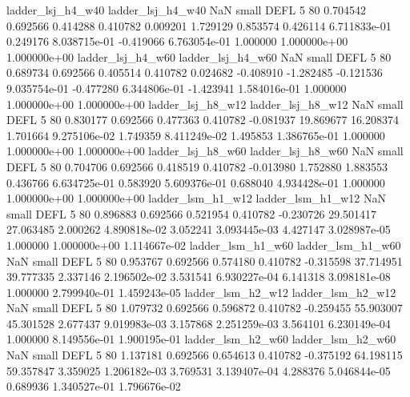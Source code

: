        ladder_lsj_h4_w40        ladder_lsj_h4_w40                   NaN      small     DEFL                 5 80 0.704542       0.692566 0.414288       0.410782    0.009201      1.729129      0.853574     0.426114   6.711833e-01  0.249176 8.038715e-01    -0.419066   6.763054e-01            1.000000    1.000000e+00        1.000000e+00
       ladder_lsj_h4_w60        ladder_lsj_h4_w60                   NaN      small     DEFL                 5 80 0.689734       0.692566 0.405514       0.410782    0.024682     -0.408910     -1.282485    -0.121536   9.035754e-01 -0.477280 6.344806e-01    -1.423941   1.584016e-01            1.000000    1.000000e+00        1.000000e+00
       ladder_lsj_h8_w12        ladder_lsj_h8_w12                   NaN      small     DEFL                 5 80 0.830177       0.692566 0.477363       0.410782   -0.081937     19.869677     16.208374     1.701664   9.275106e-02  1.749359 8.411249e-02     1.495853   1.386765e-01            1.000000    1.000000e+00        1.000000e+00
       ladder_lsj_h8_w60        ladder_lsj_h8_w60                   NaN      small     DEFL                 5 80 0.704706       0.692566 0.418519       0.410782   -0.013980      1.752880      1.883553     0.436766   6.634725e-01  0.583920 5.609376e-01     0.688040   4.934428e-01            1.000000    1.000000e+00        1.000000e+00
       ladder_lsm_h1_w12        ladder_lsm_h1_w12                   NaN      small     DEFL                 5 80 0.896883       0.692566 0.521954       0.410782   -0.230726     29.501417     27.063485     2.000262   4.890818e-02  3.052241 3.093445e-03     4.427147   3.028987e-05            1.000000    1.000000e+00        1.114667e-02
       ladder_lsm_h1_w60        ladder_lsm_h1_w60                   NaN      small     DEFL                 5 80 0.953767       0.692566 0.574180       0.410782   -0.315598     37.714951     39.777335     2.337146   2.196502e-02  3.531541 6.930227e-04     6.141318   3.098181e-08            1.000000    2.799940e-01        1.459243e-05
       ladder_lsm_h2_w12        ladder_lsm_h2_w12                   NaN      small     DEFL                 5 80 1.079732       0.692566 0.596872       0.410782   -0.259455     55.903007     45.301528     2.677437   9.019983e-03  3.157868 2.251259e-03     3.564101   6.230149e-04            1.000000    8.149556e-01        1.900195e-01
       ladder_lsm_h2_w60        ladder_lsm_h2_w60                   NaN      small     DEFL                 5 80 1.137181       0.692566 0.654613       0.410782   -0.375192     64.198115     59.357847     3.359025   1.206182e-03  3.769531 3.139407e-04     4.288376   5.046844e-05            0.689936    1.340527e-01        1.796676e-02
